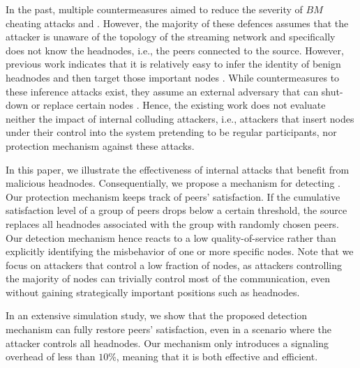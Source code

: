 In the past, multiple countermeasures aimed to reduce the severity of $BM$ cheating attacks and \drop. However, the majority of these defences \cite{zhang2005coolstreaming, defending2, antiliar} assumes that the attacker is unaware of the topology of the streaming network and specifically does not know the headnodes, i.e., the peers connected to the source. 
However, previous work indicates that it is relatively easy to infer the identity of benign headnodes and then target those important nodes \cite{nguyen2016swap}.
While countermeasures to these inference attacks exist, they assume an external adversary that can shut-down or replace certain nodes \cite{nguyen2016swap, rbcs, nguyen2014resilience}. 
Hence, the existing work does not evaluate neither the impact of internal colluding attackers, i.e., attackers that insert nodes under their control into the system pretending to be regular participants, nor protection mechanism against these attacks.


In this paper, we  illustrate the effectiveness of internal attacks that benefit from malicious headnodes. 
Consequentially, we propose a mechanism for detecting \drop. Our protection mechanism keeps track of peers' satisfaction. 
If the cumulative satisfaction level of a group of peers drops below a certain threshold, the source replaces all headnodes associated with the group with randomly chosen peers. 
Our detection mechanism hence reacts to a low quality-of-service rather than explicitly identifying the misbehavior of one or more specific nodes.
Note that we focus on attackers that control a low fraction of nodes, as attackers controlling the majority of nodes can trivially control most of the communication, even without gaining strategically important positions such as headnodes.    

In an extensive simulation study, we show that the proposed detection mechanism can fully restore peers' satisfaction, even in a scenario where the attacker controls all headnodes. 
Our mechanism only introduces a signaling overhead of less than $10\%$, meaning that it is both effective and efficient.

